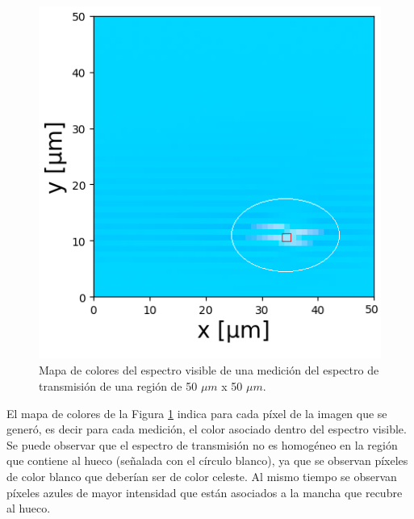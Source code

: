 \begin{figure}[H]
	\centering
	\includegraphics[scale=1.0]{Figs/microespectrometro/imhueco.png}
	\caption{Mapa de colores del espectro visible de una medición del espectro de transmisión de una región de 50 $\mu m$ x 50 $\mu m$.}
	\label{fig:mapargbag}
\end{figure}

El mapa de colores de la Figura \ref{fig:mapargbag} indica para cada píxel de la imagen que se generó, es decir para cada medición, el color asociado dentro del espectro visible. Se puede observar que el espectro de transmisión no es homogéneo en la región que contiene al hueco (señalada con el círculo blanco), ya que se observan píxeles de color blanco que deberían ser de color celeste. Al mismo tiempo se observan píxeles azules de mayor intensidad que están asociados a la mancha que recubre al hueco. 

